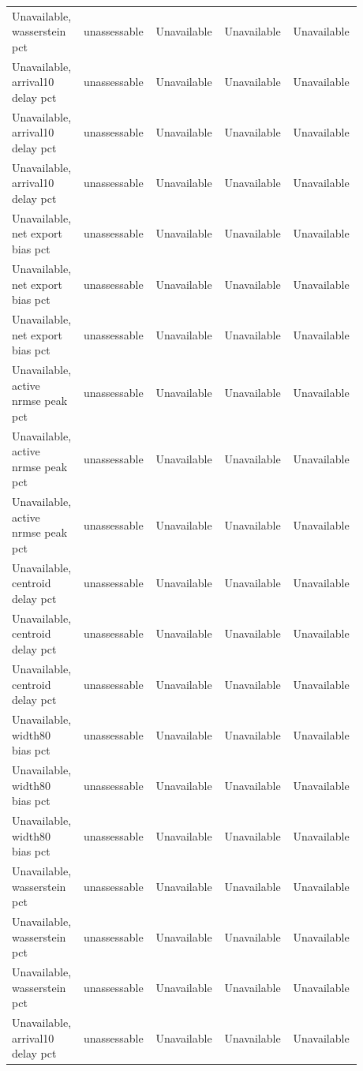 \begin{longtable}{p{0.1760\linewidth}p{0.1760\linewidth}p{0.1760\linewidth}p{0.1760\linewidth}p{0.1760\linewidth}}
Unavailable, wasserstein pct & unassessable & Unavailable & Unavailable & Unavailable \\
Unavailable, arrival10 delay pct & unassessable & Unavailable & Unavailable & Unavailable \\
Unavailable, arrival10 delay pct & unassessable & Unavailable & Unavailable & Unavailable \\
Unavailable, arrival10 delay pct & unassessable & Unavailable & Unavailable & Unavailable \\
Unavailable, net export bias pct & unassessable & Unavailable & Unavailable & Unavailable \\
Unavailable, net export bias pct & unassessable & Unavailable & Unavailable & Unavailable \\
Unavailable, net export bias pct & unassessable & Unavailable & Unavailable & Unavailable \\
Unavailable, active nrmse peak pct & unassessable & Unavailable & Unavailable & Unavailable \\
Unavailable, active nrmse peak pct & unassessable & Unavailable & Unavailable & Unavailable \\
Unavailable, active nrmse peak pct & unassessable & Unavailable & Unavailable & Unavailable \\
Unavailable, centroid delay pct & unassessable & Unavailable & Unavailable & Unavailable \\
Unavailable, centroid delay pct & unassessable & Unavailable & Unavailable & Unavailable \\
Unavailable, centroid delay pct & unassessable & Unavailable & Unavailable & Unavailable \\
Unavailable, width80 bias pct & unassessable & Unavailable & Unavailable & Unavailable \\
Unavailable, width80 bias pct & unassessable & Unavailable & Unavailable & Unavailable \\
Unavailable, width80 bias pct & unassessable & Unavailable & Unavailable & Unavailable \\
Unavailable, wasserstein pct & unassessable & Unavailable & Unavailable & Unavailable \\
Unavailable, wasserstein pct & unassessable & Unavailable & Unavailable & Unavailable \\
Unavailable, wasserstein pct & unassessable & Unavailable & Unavailable & Unavailable \\
Unavailable, arrival10 delay pct & unassessable & Unavailable & Unavailable & Unavailable \\

\end{longtable}
